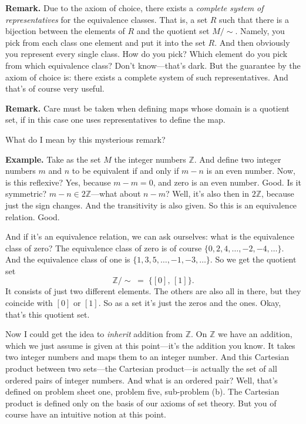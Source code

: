 \textbf{Remark.} Due to the axiom of choice, there exists a \emph{complete system of representatives} for the equivalence classes. That is, a set $R$ such that there is a bijection between the elements of $R$ and the quotient set $M / {\sim}$. Namely, you pick from each class one element and put it into the set $R$. And then obviously you represent every single class. How do you pick? Which element do you pick from which equivalence class? Don't know---that's dark. But the guarantee by the axiom of choice is: there exists a complete system of such representatives. And that's of course very useful.

\textbf{Remark.} Care must be taken when defining maps whose domain is a quotient set, if in this case one uses representatives to define the map.

What do I mean by this mysterious remark?

\textbf{Example.} Take as the set $M$ the integer numbers $\mathbb{Z}$. And define two integer numbers $m$ and $n$ to be equivalent if and only if $m - n$ is an even number. Now, is this reflexive? Yes, because $m - m = 0$, and zero is an even number. Good. Is it symmetric? $m - n \in 2\mathbb{Z}$---what about $n - m$? Well, it's also then in $2\mathbb{Z}$, because just the sign changes. And the transitivity is also given. So this is an equivalence relation. Good.

And if it's an equivalence relation, we can ask ourselves: what is the equivalence class of zero? The equivalence class of zero is of course $\{0, 2, 4, \ldots, -2, -4, \ldots\}$. And the equivalence class of one is $\{1, 3, 5, \ldots, -1, -3, \ldots\}$. So we get the quotient set
\[
\mathbb{Z} / {\sim} \;=\; \{ [0],\, [1] \}.
\]
It consists of just two different elements. The others are also all in there, but they coincide with $[0]$ or $[1]$. So as a set it's just the zeros and the ones. Okay, that's this quotient set.

Now I could get the idea to \emph{inherit} addition from $\mathbb{Z}$. On $\mathbb{Z}$ we have an addition, which we just assume is given at this point---it's the addition you know. It takes two integer numbers and maps them to an integer number. And this Cartesian product between two sets---the Cartesian product---is actually the set of all ordered pairs of integer numbers. And what is an ordered pair? Well, that's defined on problem sheet one, problem five, sub-problem (b). The Cartesian product is defined only on the basis of our axioms of set theory. But you of course have an intuitive notion at this point.

